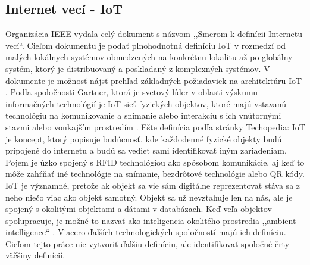 \subsection{Internet vecí - IoT}
Organizácia IEEE vydala celý dokument  s názvom ,,Smerom k definícii Internetu vecí``. Cieľom dokumentu je podať plnohodnotná definíciu IoT v rozmedzí od malých lokálnych systémov obmedzených na konkrétnu lokalitu až po globálny systém, ktorý je distribuovaný a poskladaný z komplexných systémov. V dokumente je možnosť nájsť prehľad základných požiadaviek na architektúru IoT \cite{IOT16}.
Podľa spoločnosti Gartner, ktorá je svetový líder v oblasti výskumu informačných technológií je IoT sieť fyzických objektov, ktoré majú vstavanú technológiu na komunikovanie a snímanie alebo interakciu s ich vnútornými stavmi alebo vonkajším prostredím \cite{IOT17}. 
Ešte definícia podľa stránky Techopedia: IoT je koncept, ktorý popisuje budúcnosť, kde každodenné fyzické objekty budú pripojené do internetu a budú sa vedieť sami identifikovať iným zariadeniam. Pojem je úzko spojený s RFID technológiou ako spôsobom komunikácie, aj keď to môže zahŕňať iné technológie na snímanie, bezdrôtové technológie alebo QR kódy.
\indent IoT je významné, pretože ak objekt sa vie sám digitálne reprezentovať stáva sa z neho niečo viac ako objekt samotný. Objekt sa už nevzťahuje len na nás, ale je spojený s okolitými objektami a dátami v databázach. Keď veľa objektov spolupracuje, je možné to nazvať ako inteligencia okolitého prostredia ,,ambient intelligence`` \cite{IOT18}.
Viacero ďalších technologických spoločností majú ich definíciu. Cieľom tejto práce nie vytvoriť ďalšiu definíciu, ale identifikovať spoločné črty väčšiny definícií. 
